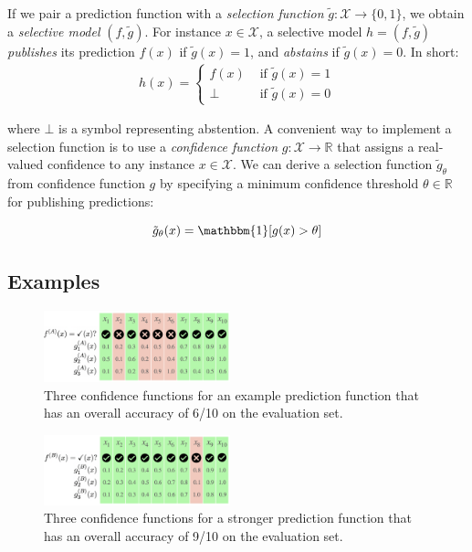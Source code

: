 \documentclass[11pt]{article}
\begin{document}
\noindent If we pair a prediction function with a \emph{selection function} $\tilde{g}: \mathcal{X} \rightarrow \{0,1\}$, we obtain a \emph{selective model} $(f,\tilde{g})$. For instance $x \in \mathcal{X}$, a selective model $h = (f, \tilde{g})$ \emph{publishes} its prediction $f(x)$ if $\tilde{g}(x)=1$, and \emph{abstains} if $\tilde{g}(x)=0$. In short:
\begin{gather*}
h(x) = \begin{cases}
               f(x) &\mbox{ if } \tilde{g}(x)=1\\
               \bot &\mbox{ if } \tilde{g}(x)=0
       \end{cases}
\end{gather*}

\noindent where $\bot$ is a symbol representing abstention. A convenient way to implement a selection function is to use a \emph{confidence function} $g: \mathcal{X} \rightarrow \mathbb{R}$ that assigns a real-valued confidence to any instance $x \in \mathcal{X}$. We can derive a selection function $\tilde{g}_\theta$ from confidence function $g$ by specifying a minimum confidence threshold $\theta \in \mathbb{R}$ for publishing predictions:

\begin{equation*}
\tilde{g}_\theta(x) = \mathbbm{1}[g(x) > \theta]
\end{equation*}

\subsection{Examples}

\begin{figure}
\centering
\includegraphics[width=0.48\textwidth]{example1.png}
\caption{Three confidence functions for an example prediction function that has an overall accuracy of 6/10 on the evaluation set.}
\label{fig:example1}
\end{figure}

\begin{figure}
\centering
\includegraphics[width=0.48\textwidth]{example2.png}
\caption{Three confidence functions for a stronger prediction function that has an overall accuracy of 9/10 on the evaluation set.}
\label{fig:example2}
\end{figure}
\end{document}
